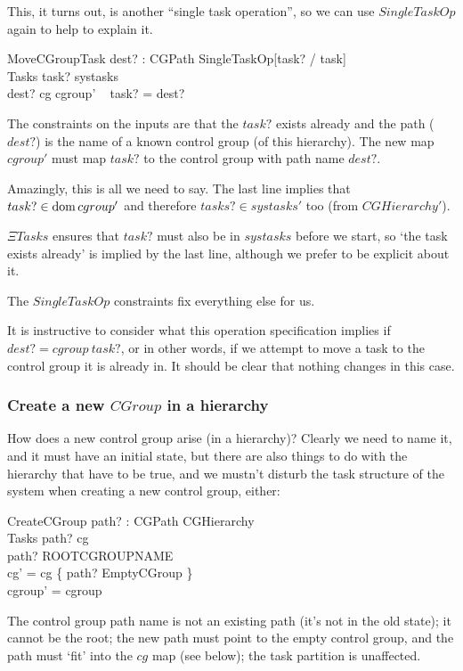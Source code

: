 \documentclass[a4paper,twoside,12pt]{article}
\begin{document}
This, it turns out, is another ``single task operation'', so we can use $SingleTaskOp$ again to help to explain it.

\begin{schema}{MoveCGroupTask}
dest? : CGPath
\also
SingleTaskOp[task? / task] \\
\Xi Tasks
\where
task? \in systasks \\
dest? \in \dom cg
\also
cgroup' ~ task?  = dest?
\end{schema}
The constraints on the inputs are that the $task?$ exists already and
the path ($dest?$) is the name of a known control group (of this hierarchy).
The new map $cgroup'$ must map $task?$ to the control group with path name $dest?$.

Amazingly, this is all we need to say. The last line implies that $task? \in \mathop{\mathrm{dom}} cgroup'$ and therefore
$tasks? \in systasks'$ too (from $CGHierarchy'$).

$\Xi Tasks$ ensures that $task?$ must also be in $systasks$ before we start, so `the task exists already' is implied by the last line, although we prefer to be explicit about it.

The $SingleTaskOp$ constraints fix everything else for us.

It is instructive to consider what this operation specification implies if $dest? = cgroup ~ task?$, or in other words, if we
attempt to move a task to the control group it is already in. It should be clear that nothing changes in this case.

\subsubsection{Create a new $CGroup$ in a hierarchy}

How does a new control group arise (in a hierarchy)?
Clearly we need to name it, and it must have an initial state, but there are also things to do with the
hierarchy that have to be true, and we mustn't disturb the task structure of the system when
creating a new control group, either:

\begin{schema}{CreateCGroup}
path? : CGPath
\also
\Delta CGHierarchy \\
\Xi Tasks
\where
path? \notin \dom cg \\
path? \neq ROOTCGROUPNAME \\
cg' = cg \cup \{ path? \mapsto EmptyCGroup \} \\
cgroup' = cgroup
\end{schema}
The control group path name is not an existing path (it's not in the old state); it cannot be the root; 
the new path must point to the empty control group, and the path must `fit' into the $cg$ map (see below); the task partition is unaffected.
\end{document}
